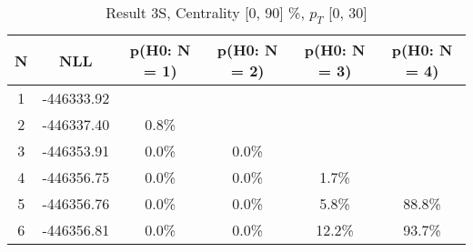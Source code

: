 \begin{table}[htb]
	\begin{center}
	\caption{Result 3S, Centrality [0, 90] \%, $p_{T}$ [0, 30] \GeV
}
{\footnotesize\renewcommand{\arraystretch}{1.4}
		\begin{tabular}{cc||cccc}
			N & NLL & p(H0: N = 1) & p(H0: N = 2) & p(H0: N = 3) & p(H0: N = 4)\\ 
		\hline
1 & -446333.92 & & & & \\
2 & -446337.40 & 0.8\% & & & \\
3 & -446353.91 & 0.0\% & 0.0\% & & \\
4 & -446356.75 & 0.0\% & 0.0\% & 1.7\% & \\
5 & -446356.76 & 0.0\% & 0.0\% & 5.8\% & 88.8\% \\
6 & -446356.81 & 0.0\% & 0.0\% & 12.2\% & 93.7\% \\
	\end{tabular}
		\label{tab:lab}
	}
	\end{center}\end{table}

